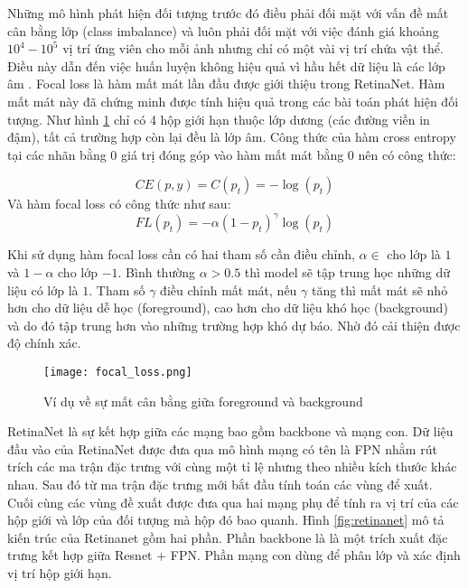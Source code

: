 \documentclass[../the.tex]{subfiles}
\begin{document}
{\fontsize{13}{12} \selectfont

	Những mô hình phát hiện đối tượng trước đó điều phải đối mặt với vấn đề mất cân bằng lớp (class imbalance) và luôn phải đối mặt với việc đánh giá khoảng $10^4 - 10^5$ vị trí ứng viên cho mỗi ảnh nhưng chỉ có một vài vị trí chứa vật thể.
	Điều này dẫn đến việc huấn luyện không hiệu quả vì hầu hết dữ liệu là các lớp âm \cite{lin2018focal}. Focal loss là hàm mất mát lần đầu được giới thiệu trong RetinaNet. Hàm mất mát này đã chứng minh được tính hiệu quả trong các bài toán phát hiện đối tượng.
	Như hình \ref{fig:focal_loss} chỉ có 4 hộp giới hạn thuộc lớp dương (các đường viền in đậm), tất cả trường hợp còn lại đều là lớp âm. Công thức của hàm cross entropy tại các nhãn bằng 0 giá trị đóng góp vào hàm mất mát bằng 0 nên có công thức:

	\begin{equation}
		CE(p,y) = C(p_t) =  -\log(p_t)
	\end{equation}
	Và hàm focal loss có công thức như sau:
	\begin{equation}
		FL(p_t) = -\alpha(1-p_t)^\gamma \log(p_t)
	\end{equation}

	Khi sử dụng hàm focal loss cần có hai tham số cần điều chỉnh, $\alpha \in$ cho lớp là $1$ và $1 - \alpha$ cho lớp $-1$.
	Bình thường $\alpha > 0.5$ thì model sẽ tập trung học những dữ liệu có lớp là $1$. Tham số $\gamma$ điều chỉnh mất mát,
	nếu $\gamma$ tăng thì mất mát sẽ nhỏ hơn cho dữ liệu dễ học (foreground), cao hơn cho dữ liệu khó học (background)
	và do đó tập trung hơn vào những trường hợp khó dự báo. Nhờ đó cải thiện được độ chính xác.

}

\begin{figure}[H]
	\centering
	\texttt{[image: focal\_loss.png]}
	\caption{Ví dụ về sự mất cân bằng giữa  foreground và background\cite{lin2018focal}}
	\label{fig:focal_loss}
\end{figure}

{\fontsize{13}{12} \selectfont

RetinaNet là sự kết hợp giữa các mạng bao gồm backbone và mạng con. Dữ
liệu đầu vào của RetinaNet được đưa qua mô hình mạng có tên là FPN \cite{lin2017feature} nhằm rút trích các ma trận đặc trưng với
cùng một tỉ lệ nhưng theo nhiều kích thước khác nhau. Sau đó từ ma trận đặc trưng mới bắt đầu tính toán các vùng để
xuất. Cuối cùng các vùng đề xuất được đưa qua hai mạng phụ để tính ra vị trí của các hộp giới và lớp của đối
tượng mà hộp đó bao quanh. Hình \ref{fig:retinanet} mô tả kiến trúc của Retinanet gồm hai phần. Phần backbone là
là một trích xuất đặc trưng kết hợp giữa Resnet + FPN. Phần mạng con dùng để phân lớp và
xác định vị trí hộp giới hạn.

}
\end{document}
